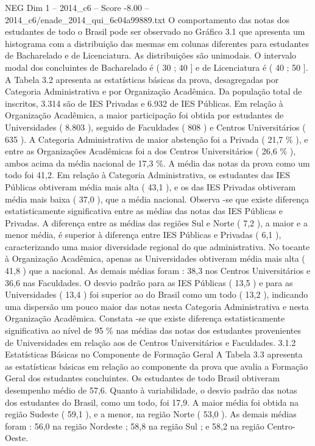 \begin{textsample}{NEG Dim 1 – 2014\_c6 – Score -8.00 – 2014\_c6/enade\_2014\_qui\_6c04a99889.txt}
O comportamento das notas dos estudantes de todo o Brasil pode ser observado no Gráfico 3.1 que apresenta um histograma com a distribuição das mesmas em colunas diferentes para estudantes de Bacharelado e de Licenciatura.
As distribuições são unimodais.
O intervalo modal dos concluintes de Bacharelado é ( 30 ; 40 ] e de Licenciatura é ( 40 ; 50 ].
A Tabela 3.2 apresenta as estatísticas básicas da prova, desagregadas por Categoria Administrativa e por Organização Acadêmica.
Da população total de inscritos, 3.314 são de IES Privadas e 6.932 de IES Públicas.
Em relação à Organização Acadêmica, a maior participação foi obtida por estudantes de Universidades ( 8.803 ), seguido de Faculdades ( 808 ) e Centros Universitários ( 635 ).
A Categoria Administrativa de maior abstenção foi a Privada ( 21,7 \% ), e entre as Organizações Acadêmicas foi a dos Centros Universitários ( 26,6 \% ), ambos acima da média nacional de 17,3 \%.
A média das notas da prova como um todo foi 41,2.
Em relação à Categoria Administrativa, os estudantes das IES Públicas obtiveram média mais alta ( 43,1 ), e os das IES Privadas obtiveram média mais baixa ( 37,0 ), que a média nacional.
Observa -se que existe diferença estatisticamente significativa entre as médias das notas das IES Públicas e Privadas.
A diferença entre as médias das regiões Sul e Norte ( 7,2 ), a maior e a menor média, é superior à diferença entre IES Públicas e Privadas ( 6,1 ), caracterizando uma maior diversidade regional do que administrativa.
No tocante à Organização Acadêmica, apenas as Universidades obtiveram média mais alta ( 41,8 ) que a nacional.
As demais médias foram : 38,3 nos Centros Universitários e 36,6 nas Faculdades.
O desvio padrão para as IES Públicas ( 13,5 ) e para as Universidades ( 13,4 ) foi superior ao do Brasil como um todo ( 13,2 ), indicando uma dispersão um pouco maior das notas nesta Categoria Administrativa e nesta Organização Acadêmica.
Constata -se que existe diferença estatisticamente significativa ao nível de 95 \% nas médias das notas dos estudantes provenientes de Universidades em relação aos de Centros Universitários e Faculdades. 3.1.2 Estatísticas Básicas no Componente de Formação Geral A Tabela 3.3 apresenta as estatísticas básicas em relação ao componente da prova que avalia a Formação Geral dos estudantes concluintes.
Os estudantes de todo Brasil obtiveram desempenho médio de 57,6.
Quanto à variabilidade, o desvio padrão das notas dos estudantes do Brasil, como um todo, foi 17,9.
A maior média foi obtida na região Sudeste ( 59,1 ), e a menor, na região Norte ( 53,0 ).
As demais médias foram : 56,0 na região Nordeste ; 58,8 na região Sul ; e 58,2 na região Centro-Oeste.

\end{textsample}
